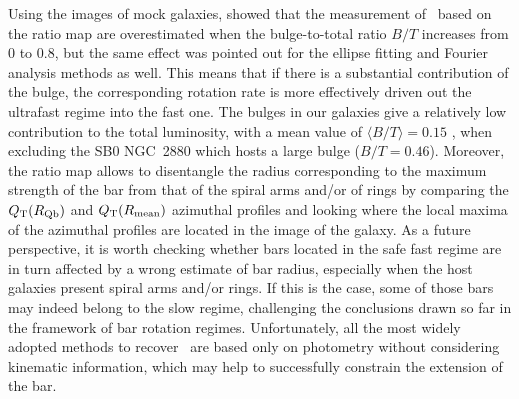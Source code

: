 \documentclass{aa}
\begin{document}
Using the images of mock galaxies, \cite{Lee2020} showed that the measurement of \rbar\ based on the ratio map are overestimated when the bulge-to-total ratio $B/T$ increases from 0 to 0.8, but the same effect was pointed out for the ellipse fitting and Fourier analysis methods as well. This means that if there is a substantial contribution of the bulge, the corresponding rotation rate is more effectively driven out the ultrafast regime into the fast one. The bulges in our galaxies give a relatively low contribution to the total luminosity, with a mean value of $\langle B/T\rangle=0.15$ \citep{MendezAbreu2017}, when excluding the SB0 NGC~2880 which hosts a large bulge ($B/T=0.46$). Moreover, the ratio map allows to disentangle the radius corresponding to the maximum strength of the bar from that of the spiral arms and/or of rings by comparing the $Q_{\rm T}(R_{\rm Qb})$ and $Q_{\rm T}(R_{\rm mean})$ azimuthal profiles and looking where the local maxima of the azimuthal profiles are located in the image of the galaxy. As a future perspective, it is worth checking whether bars located in the safe fast regime are in turn affected by a wrong estimate of bar radius, especially when the host galaxies present spiral arms and/or rings. If this is the case, some of those bars may indeed belong to the slow regime, challenging the conclusions drawn so far in the framework of bar rotation regimes. Unfortunately, all the most widely adopted methods to recover \rbar\ are based only on photometry without considering kinematic information, which may help to successfully constrain the extension of the bar.
\end{document}
